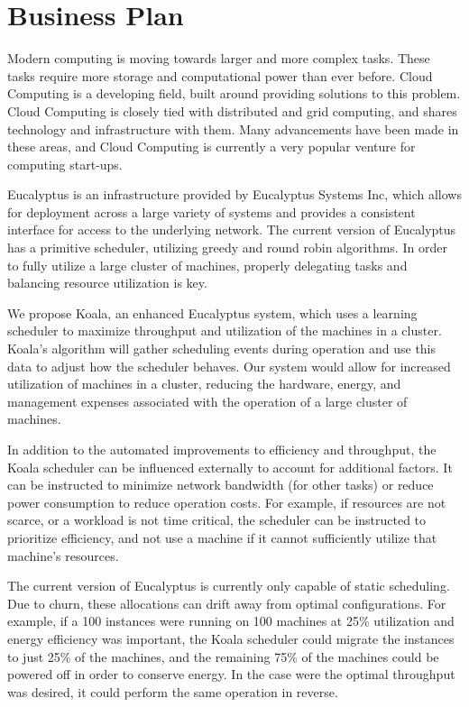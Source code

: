\section{Business Plan}
  Modern computing is moving towards larger and more complex tasks.  These tasks require more storage and computational power than ever before.  Cloud Computing is a developing field, built around providing solutions to this problem.  Cloud Computing is closely tied with distributed and grid computing, and shares technology and infrastructure with them.  Many advancements have been made in these areas, and Cloud Computing is currently a very popular venture for computing start-ups.

  Eucalyptus is an infrastructure provided by Eucalyptus Systems Inc, which allows for deployment across a large variety of systems and provides a consistent interface for access to the underlying network.  The current version of Eucalyptus has a primitive scheduler, utilizing greedy and round robin algorithms.  In order to fully utilize a large cluster of machines, properly delegating tasks and balancing resource utilization is key.

  We propose Koala, an enhanced Eucalyptus system, which uses a learning scheduler to maximize throughput and utilization of the machines in a cluster.  Koala's algorithm will gather scheduling events during operation and use this data to adjust how the scheduler behaves.  Our system would allow for increased utilization of machines in a cluster, reducing the hardware, energy, and management expenses associated with the operation of a large cluster of machines.

  In addition to the automated improvements to efficiency and throughput, the Koala scheduler can be influenced externally to account for additional factors.  It can be instructed to minimize network bandwidth (for other tasks) or reduce power consumption to reduce operation costs.  For example, if resources are not scarce, or a workload is not time critical, the scheduler can be instructed to prioritize efficiency, and not use a machine if it cannot sufficiently utilize that machine's resources.
 
  The current version of Eucalyptus is currently only capable of static scheduling.  Due to churn, these allocations can drift away from optimal configurations.  For example, if a 100 instances were running on 100 machines at 25\% utilization and energy efficiency was important, the Koala scheduler could migrate the instances to just 25\% of the machines, and the remaining 75\% of the machines could be powered off in order to conserve energy.  In the case were the optimal throughput was desired, it could perform the same operation in reverse.  

